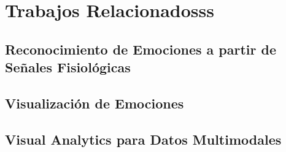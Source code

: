 \section{Trabajos Relacionadosss}\label{sec:related}

\subsection{Reconocimiento de Emociones a partir de Señales Fisiológicas}

\subsection{Visualización de Emociones}

\subsection{Visual Analytics para Datos Multimodales}

